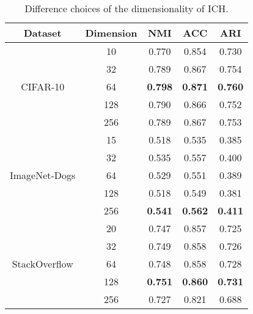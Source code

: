 \begin{table}[!h]
\centering
\caption{Difference choices of the dimensionality of ICH.}
\begin{tabular}{@{}ccccc@{}}
\toprule
Dataset                      & Dimension & NMI       & ACC       & ARI       \\ \midrule
\multirow{5}{*}{CIFAR-10}    & 10                    &   0.770     &     0.854      & 0.730           \\
                             & 32                    &   0.789     &     0.867      & 0.754   \\
                             & 64                 &   \textbf{0.798}     &     \textbf{0.871}      & \textbf{0.760}         \\
                             & 128                  & 0.790 & 0.866 & 0.752      \\
                             & 256          &   0.789     &     0.867      & 0.753           \\ \midrule
\multirow{5}{*}{ImageNet-Dogs} & 15                    &   0.518     &     0.535      &  0.385  \\
                             & 32                    & 0.535 & 0.557 & 0.400 \\
                             & 64                    &   0.529     &     0.551      & 0.389 \\
                             & 128                   & 0.518 & 0.549 & 0.381      \\
                             & 256              &   \textbf{0.541}     &     \textbf{0.562}      & \textbf{0.411}\\
                             \midrule
\multirow{5}{*}{StackOverflow} & 20                    &   0.747        &  0.857         &    0.725       \\
                             & 32                    & 0.749 & 0.858 & 0.726 \\
                             & 64                    & 0.748          &  0.858         &  0.728        \\
                             & 128                   & \textbf{0.751} & \textbf{0.860} & \textbf{0.731}       \\
                             & 256                   & 0.727          & 0.821          & 0.688          \\ \bottomrule

\end{tabular}
\label{tab:dimensionality}
\end{table}


